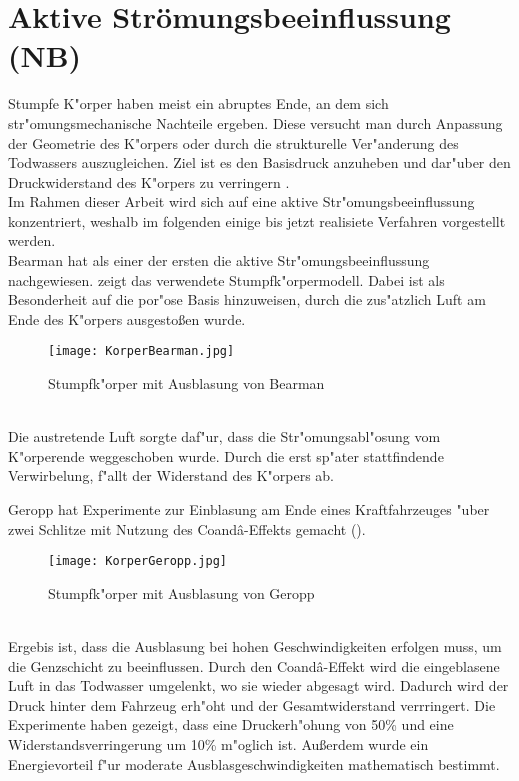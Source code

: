 \section{Aktive Str\"omungsbeeinflussung (NB)}

Stumpfe K"orper haben meist ein abruptes Ende, an dem sich str"omungsmechanische Nachteile ergeben. Diese versucht man durch Anpassung der Geometrie des K"orpers oder durch die strukturelle Ver"anderung des Todwassers auszugleichen. Ziel ist es den Basisdruck anzuheben und dar"uber den Druckwiderstand des K"orpers zu verringern \cite{Hucho.2011}.\\
Im Rahmen dieser Arbeit wird sich auf eine aktive Str"omungsbeeinflussung konzentriert, weshalb im folgenden einige bis jetzt realisiete Verfahren vorgestellt werden.\\

Bearman \cite{Hucho.2011} hat als einer der ersten die aktive Str"omungsbeeinflussung nachgewiesen.  zeigt das verwendete Stumpfk"orpermodell. Dabei ist als Besonderheit auf die por"ose Basis hinzuweisen, durch die zus"atzlich Luft am Ende des K"orpers ausgesto\ss{}en wurde.
\begin{figure}[h]
	\centering
	\texttt{[image: KorperBearman.jpg]}
	\caption{Stumpfk"orper mit Ausblasung von Bearman \cite{Hucho.2011}}
	\label{fig:Bearman}
\end{figure}\\
Die austretende Luft sorgte daf"ur, dass die Str"omungsabl"osung vom K"orperende weggeschoben wurde. Durch die erst sp"ater stattfindende Verwirbelung, f"allt der Widerstand des K"orpers ab.

Geropp \cite{Geropp.2000} hat Experimente zur Einblasung am Ende eines Kraftfahrzeuges "uber zwei Schlitze mit Nutzung des Coand\^{a}-Effekts gemacht ().
\begin{figure}[h]
	\centering
	\texttt{[image: KorperGeropp.jpg]}
	\caption{Stumpfk"orper mit Ausblasung von Geropp \cite{Geropp.2000}}
	\label{fig:Geropp}
\end{figure}\\
Ergebis ist, dass die Ausblasung bei hohen Geschwindigkeiten erfolgen muss, um die Genzschicht zu beeinflussen. Durch den Coand\^{a}-Effekt wird die eingeblasene Luft in das Todwasser umgelenkt, wo sie wieder abgesagt wird. Dadurch wird der Druck hinter dem Fahrzeug erh"oht und der Gesamtwiderstand verrringert. Die Experimente haben gezeigt, dass eine Druckerh"ohung von 50\% und eine Widerstandsverringerung um 10\% m"oglich ist. Au\ss{}erdem wurde ein Energievorteil f"ur moderate Ausblasgeschwindigkeiten mathematisch bestimmt.\\

